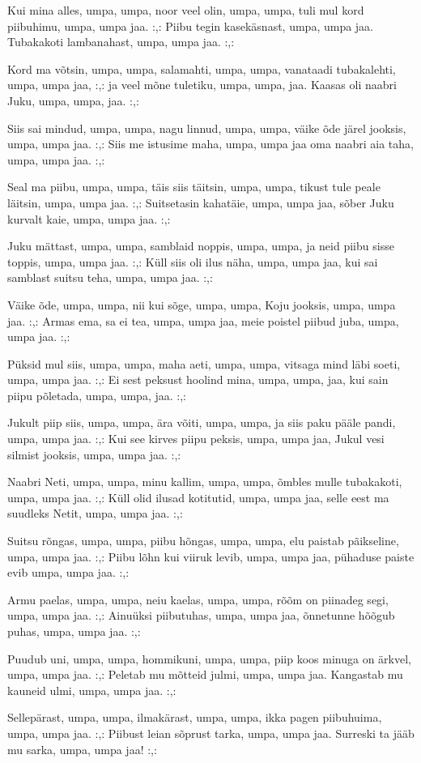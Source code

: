 Kui mina alles, umpa, umpa,
noor veel olin, umpa, umpa,
tuli mul kord piibuhimu, umpa, umpa jaa.
:,: Piibu tegin kasek\"asnast, umpa, umpa jaa.
    Tubakakoti lambanahast, umpa, umpa jaa. :,: 

Kord ma v\~otsin, umpa, umpa,
salamahti, umpa, umpa,
vanataadi tubakalehti, umpa, umpa jaa,
:,: ja veel m\~one tuletiku, umpa, umpa, jaa.
    Kaasas oli naabri Juku, umpa, umpa, jaa. :,:
	
Siis sai mindud, umpa, umpa,
nagu linnud, umpa, umpa,
v\"aike \~ode j\"arel jooksis, umpa, umpa jaa.
:,: Siis me istusime maha, umpa, umpa jaa
    oma naabri aia taha, umpa, umpa jaa. :,: 

Seal ma piibu, umpa, umpa,
t\"ais siis t\"aitsin, umpa, umpa,
tikust tule peale l\"aitsin, umpa, umpa jaa.
:,: Suitsetasin kahat\"aie, umpa, umpa jaa,
    s\~ober Juku kurvalt kaie, umpa, umpa jaa. :,:
	
Juku m\"attast, umpa, umpa,
samblaid noppis, umpa, umpa,
ja neid piibu sisse toppis, umpa, umpa jaa.
:,: K\"ull siis oli ilus n\"aha, umpa, umpa jaa,
    kui sai samblast suitsu teha, umpa, umpa jaa. :,: 

V\"aike \~ode, umpa, umpa,
nii kui s\~oge, umpa, umpa,
Koju jooksis, umpa, umpa jaa.
:,: Armas ema, sa ei tea, umpa, umpa jaa, 
    meie poistel piibud juba, umpa, umpa jaa. :,: 
	
P\"uksid mul siis, umpa, umpa,
maha aeti, umpa, umpa,
vitsaga mind l\"abi soeti, umpa, umpa jaa.
:,: Ei sest peksust hoolind mina, umpa, umpa, jaa,
    kui sain piipu p\~oletada, umpa, umpa, jaa. :,:

Jukult piip siis, umpa, umpa,
\"ara v\~oiti, umpa, umpa,
ja siis paku p\"a\"ale pandi, umpa, umpa jaa.
:,: Kui see kirves piipu peksis, umpa, umpa jaa,
    Jukul vesi silmist jooksis, umpa, umpa jaa. :,: 

Naabri Neti, umpa, umpa,
minu kallim, umpa, umpa,
\~ombles mulle tubakakoti, umpa, umpa jaa.
:,: K\"ull olid ilusad kotitutid, umpa, umpa jaa,
    selle eest ma suudleks Netit, umpa, umpa jaa. :,: 

Suitsu r\~ongas, umpa, umpa,
piibu h\~ongas, umpa, umpa,
elu paistab p\~aikseline, umpa, umpa jaa.
:,: Piibu l\~ohn kui viiruk levib, umpa, umpa jaa,
    p\"uhaduse paiste evib umpa, umpa jaa. :,:

Armu paelas, umpa, umpa,
neiu kaelas, umpa, umpa,
r\~o\~om on piinadeg segi, umpa, umpa jaa.
:,: Ainu\"uksi piibutuhas, umpa, umpa jaa,
    \~onnetunne h\~o\~ogub puhas, umpa, umpa jaa. :,:
	
Puudub uni, umpa, umpa,
hommikuni, umpa, umpa,
piip koos minuga on \"arkvel, umpa, umpa jaa.
:,: Peletab mu m\~otteid julmi, umpa, umpa jaa.
    Kangastab mu kauneid ulmi, umpa, umpa jaa. :,:
	
Sellep\"arast, umpa, umpa,
ilmak\"arast, umpa, umpa,
ikka pagen piibuhuima, umpa, umpa jaa.
:,: Piibust leian s\~oprust tarka, umpa, umpa jaa.
    Surreski ta j\"a\"ab mu sarka, umpa, umpa jaa! :,: